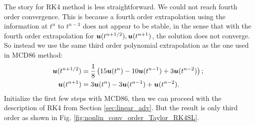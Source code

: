 \documentclass[11pt,letterpaper]{article}
\begin{document}
The story for RK4 method is less straightforward. We could not reach fourth order convergence. This is because a fourth order extrapolation using the information at $t^n$ to $t^{n-3}$ does not appear to be stable, in the sense that with the fourth order extrapolation for $\boldsymbol{u}(t^{n+1/2}),\boldsymbol{u}(t^{n+1})$, the solution does not converge. So instead we use the same third order polynomial extrapolation as the one used in MCD86 method:
\begin{align*}
    \boldsymbol{u}(t^{n+1/2}) &= \frac{1}{8}\left(15\boldsymbol{u}(t^n)-10\boldsymbol{u}(t^{n-1})+3\boldsymbol{u}(t^{n-2})\right);\\
    \boldsymbol{u}(t^{n+1}) &= 3\boldsymbol{u}(t^n)-3\boldsymbol{u}(t^{n-1})+\boldsymbol{u}(t^{n-2}).
\end{align*}
Initialize the first few steps with MCD86, then we can proceed with the description of RK4 from Section \ref{sec:linear_adv}. But the result is only third order as shown in Fig. \ref{fig:nonlin_conv_order_Taylor_RK4SL}.
\end{document}
